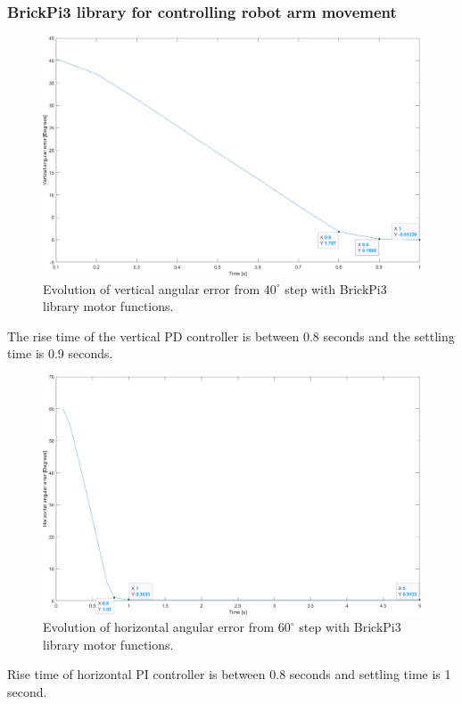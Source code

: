 \subsubsection{BrickPi3 library for controlling robot arm movement}
\label{sec:simon16}
\begin{figure}[h]
\centering
\includegraphics[width=\linewidth]{sections/assets/Vertical_built_in_functions.png}
\caption{Evolution of vertical angular error from \(40^{\circ}\) step with BrickPi3 library motor functions.}
\label{vert_bp3}
\end{figure}
The rise time of the vertical PD controller is between 0.8 seconds and the settling time is 0.9 seconds.
\begin{figure}[h]
\centering
\includegraphics[width=\linewidth]{sections/assets/Horizontal_built_in_funtion.png}
\caption{Evolution of horizontal angular error from \(60^{\circ}\) step with BrickPi3 library motor functions.}
\label{Horizontal_bp3}
\end{figure}
Rise time of horizontal PI controller is between 0.8 seconds and settling time is 1 second.

